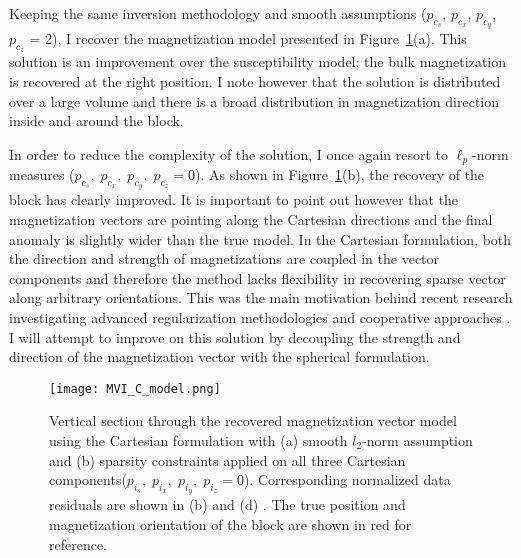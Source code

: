 Keeping the same inversion methodology and smooth assumptions ($p_{c_s}$, $p_{c_x}$, $p_{c_y}$, $p_{c_z}$ = 2), I recover the magnetization model presented in Figure~\ref{MVI_C_model}(a).
This solution is an improvement over the susceptibility model; the bulk magnetization is recovered at the right position. I note however that the solution is distributed over a large volume and there is a broad distribution in magnetization direction inside and around the block.

In order to reduce the complexity of the solution, I once again resort to $\ell_p$-norm measures ($p_{c_s}, \;p_{c_x},\; p_{c_y},\; p_{c_z} = 0$). As shown in Figure~\ref{MVI_C_model}(b), the recovery of the block has clearly improved. It is important to point out however that the magnetization vectors are pointing along the Cartesian directions and the final anomaly is slightly wider than the true model. In the Cartesian formulation, both the direction and strength of magnetizations are coupled in the vector components and therefore the method lacks flexibility in recovering sparse vector along arbitrary orientations. This was the main motivation behind recent research investigating advanced regularization methodologies and cooperative approaches \cite[]{Zhu2015, Liu2015, Fournier2015}. I will attempt to improve on this solution by decoupling the strength and direction of the magnetization vector with the spherical formulation.
\begin{figure}[h!]
\texttt{[image: MVI\_C\_model.png]}
\caption{Vertical section through the recovered magnetization vector model using the Cartesian formulation with (a) smooth $l_2$-norm assumption and (b) sparsity constraints applied on all three Cartesian components($p_{i_s}, \;p_{i_x},\; p_{i_y},\; p_{i_z} = 0$). Corresponding normalized data residuals are shown in (b) and (d) . The true position and magnetization orientation of the block are shown in red for reference.}
\label{MVI_C_model}
\end{figure}

